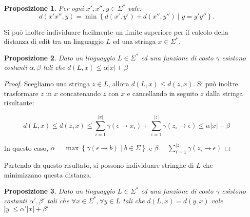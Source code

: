 \documentclass[a4paper,12pt]{report}
\theoremstyle{propositionstyle}
\newtheorem{prop}{Proposizione}[chapter]
\begin{document}
    \begin{prop}
        Per ogni $x', x'', y \in \Sigma^*$ vale:
        \[
            d\left(x'x'', y\right) = \min\left\{d\left(x', y'\right) + d\left(x'', y''\right) \mid y = y'y''\right\}.
        \]
    \end{prop}

    Si può inoltre individuare facilmente un limite superiore per il calcolo della distanza di edit
    tra un linguaggio $L$ ed una stringa $x \in \Sigma^*$.

    \begin{prop}
        \label{prop:distanza-limitata}
        Dato un linguaggio $L \in \Sigma^*$ ed una funzione di costo $\gamma$ esistono costanti $\alpha, \beta$ tali che
        $d\left(L, x\right) \leq \alpha \lvert x \rvert + \beta$
    \end{prop}

    \begin{proof}
        Scegliamo una stringa $z \in L$, allora $d\left(L, x\right) \leq d\left(z, x\right)$.
        Si può inoltre trasformare $z$ in $x$ concatenando $z$ con $x$ e cancellando in seguito $z$ dalla stringa risultante:

        $$\displaystyle d\left(L, x\right) \leq d\left(z, x\right) \leq \sum_{i=1}^{\lvert x \rvert} \gamma\left(\epsilon \rightarrow x_i\right) + \sum_{i=1}^{\lvert z \rvert} \gamma\left(z_i \rightarrow \epsilon\right) \leq \alpha \lvert x \rvert + \beta$$

        In questo caso, $\alpha = \max\left\{\gamma\left(\epsilon \rightarrow b\right) \mid b \in \Sigma\right\}$ e $\beta = \sum_{i=1}^{\lvert z \rvert} \gamma\left(z_i \rightarrow \epsilon\right)$
    \end{proof}

    Partendo da questo risultato, si possono individuare stringhe di $L$ che minimizzano questa distanza.

    \begin{prop}
        \label{prop:stringa-limitata}
        Dato un linguaggio $L \in \Sigma^*$ ed una funzione di costo $\gamma$ esistono costanti $\alpha', \beta'$ tali che
        $\forall{x \in \Sigma^*}, \forall{y \in L}$ tali che $d\left(L, x\right) = d\left(y, x\right)$ vale $\lvert y \rvert \leq \alpha' \lvert x \rvert + \beta'$
    \end{prop}
\end{document}
